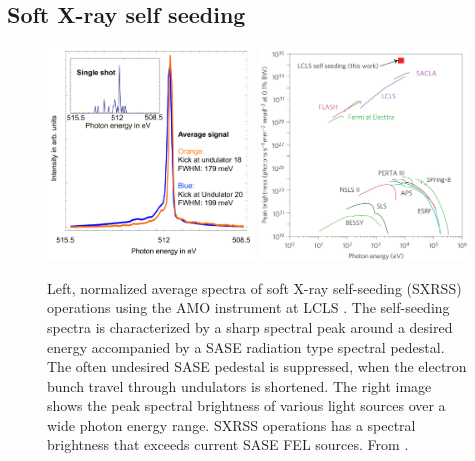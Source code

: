 \subsection{Soft X-ray self seeding}
\begin{figure}
	\centering
		\includegraphics[width=0.49\textwidth]{images/Soft-X-ray-self-seeding.pdf}
		\includegraphics[width=0.49\textwidth]{images/spectral-brightness-fletcher-2015.jpg}
	\caption[Soft X-ray self-seeding spectra and brilliance of various lightsources.]{Left, normalized average spectra of soft X-ray self-seeding (SXRSS) operations using the AMO instrument at LCLS \cite[see][]{Bucher-2014-Unpublished}. The self-seeding spectra is characterized by a sharp spectral peak around a desired energy accompanied by a SASE radiation type spectral pedestal. The often undesired SASE pedestal is suppressed, when the electron bunch travel through undulators is shortened. The right image shows the peak spectral brightness of various light sources over a wide photon energy range. SXRSS operations has a spectral brightness that exceeds current SASE FEL sources. From \citep{Fletcher-2015-NatPho}.}
	\label{fig:soft-xray-self-seeding}
\end{figure}

